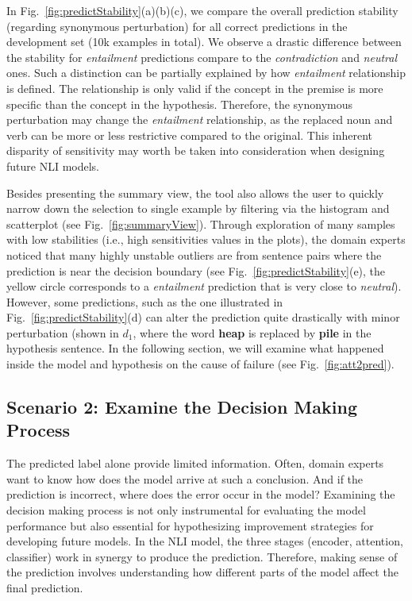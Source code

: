 In Fig.~\ref{fig:predictStability}(a)(b)(c), we compare the overall prediction stability (regarding synonymous perturbation) for all correct predictions in the development set (10k examples in total).
%
We observe a drastic difference between the stability for \emph{entailment} predictions compare to the \emph{contradiction} and \emph{neutral} ones.
%
Such a distinction can be partially explained by how \emph{entailment} relationship is defined. The relationship is only valid if the concept in the premise is more specific than the concept in the hypothesis. Therefore, the synonymous perturbation may change the \emph{entailment} relationship, as the replaced noun and verb can be more or less restrictive compared to the original.
This inherent disparity of sensitivity may worth be taken into consideration when designing future NLI models.

Besides presenting the summary view, the tool also allows the user to quickly narrow down the selection to single example by filtering via the histogram and scatterplot (see Fig.~\ref{fig:summaryView}).
%
Through exploration of many samples with low stabilities (i.e., high sensitivities values in the plots), the domain experts noticed that many highly unstable outliers are from sentence pairs where the prediction is near the decision boundary (see Fig.~\ref{fig:predictStability}(e), the yellow circle corresponds to a \emph{entailment} prediction that is very close to \emph{neutral}).
However, some predictions, such as the one illustrated in Fig.~\ref{fig:predictStability}(d) can alter the prediction quite drastically with minor perturbation (shown in $d_1$, where the word \textbf{heap} is replaced by \textbf{pile} in the hypothesis sentence. In the following section, we will examine what happened inside the model and hypothesis on the cause of failure (see Fig.~\ref{fig:att2pred}).

\subsection{Scenario 2: Examine the Decision Making Process}
The predicted label alone provide limited information. Often, domain experts want to know how does the model arrive at such a conclusion. And if the prediction is incorrect, where does the error occur in the model?
%
Examining the decision making process is not only instrumental for evaluating the model performance but also essential for hypothesizing improvement strategies for developing future models.
%
In the NLI model, the three stages (encoder, attention, classifier) work in synergy to produce the prediction.
Therefore, making sense of the prediction involves understanding how different parts of the model affect the final prediction.

